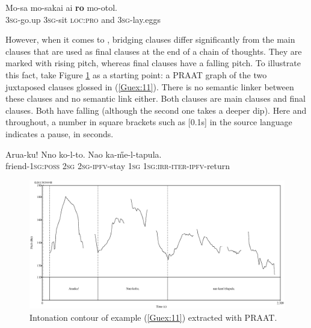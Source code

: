 \documentclass[output=paper]{LSP/langsci}
\begin{document}
\begin{exe}
\ex \label{Guex:10}
\gll Mo-sa    mo-sakai  ai \textbf{ro}  mo-otol.\\     	       
\textsc{3sg}-go.up \textsc{3sg}-sit \textsc{loc:pro}  and   \textsc{3sg}-lay.eggs\\
\glt {} \citep[][320]{guerin11}
\end{exe}

However, when it comes to , bridging clauses differ significantly from the main clauses that are used as final clauses at the end of a chain of thoughts. They are marked with rising pitch, whereas final clauses have a falling pitch. To illustrate this fact, take Figure \ref{GuF1} as a starting point: a PRAAT graph of the two juxtaposed clauses glossed in (\ref{Guex:11}). There is no semantic linker between these clauses and no semantic link either. Both clauses are main clauses and final clauses. Both have falling  (although the second one takes a deeper dip). Here and throughout, a number in square brackets such as [0.1s] in the source language indicates a pause, in seconds.\nocite{PRAAT}

\begin{exe}
\ex \label{Guex:11}
\gll Arua-ku!      Nno  ko-l-to.            Nao   ka-\H{m}e-l-tapula.\\     	       
friend-\textsc{1sg:poss}   \textsc{2sg}  \textsc{2sg-ipfv-}stay \textsc{1sg}   \textsc{1sg:irr-iter-ipfv}-return \\
\glt {} 
\end{exe}

\begin{figure}[ht]
\includegraphics[width=\textwidth]{figures/guerinFig1.eps}%
\caption{Intonation contour of example (\ref{Guex:11}) extracted with PRAAT. \label{GuF1}}
\end{figure}
\end{document}
